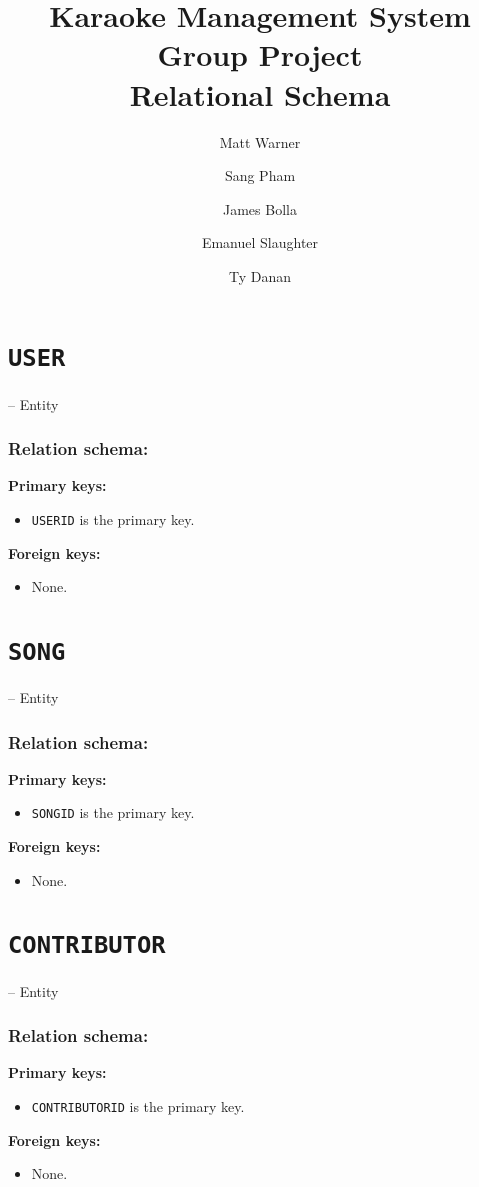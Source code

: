\documentclass{report}
\title{\Huge\textbf{Karaoke Management System Group Project}\\[1em] 
\Huge Relational Schema}
\author{
    \Large Matt Warner \and
    \Large Sang Pham \and
    \Large James Bolla \and
    \Large Emanuel Slaughter \and
    \Large Ty Danan
}
\date{\huge{}}
\begin{document}
\maketitle
\section{\texttt{USER}}
-- Entity
\subsubsection*{Relation schema:}
\bigbreak \noindent
\textbf{Primary keys:}
\begin{itemize}
    \item \texttt{USERID} is the primary key.
\end{itemize}
\bigbreak \noindent
\textbf{Foreign keys:}
\begin{itemize}
    \item None.
\end{itemize}
\hline
\section{\texttt{SONG}}
-- Entity
\subsubsection*{Relation schema:}
\bigbreak \noindent
\textbf{Primary keys:}
\begin{itemize}
    \item \texttt{SONGID} is the primary key.
\end{itemize}
\bigbreak \noindent
\textbf{Foreign keys:}
\begin{itemize}
    \item None.
\end{itemize}
\hline
\section{\texttt{CONTRIBUTOR}}
-- Entity
\subsubsection*{Relation schema:}
\bigbreak \noindent
\textbf{Primary keys:}
\begin{itemize}
    \item \texttt{CONTRIBUTORID} is the primary key.
\end{itemize}
\bigbreak \noindent
\textbf{Foreign keys:}
\begin{itemize}
    \item None.
\end{itemize}
\hline
\end{document}

